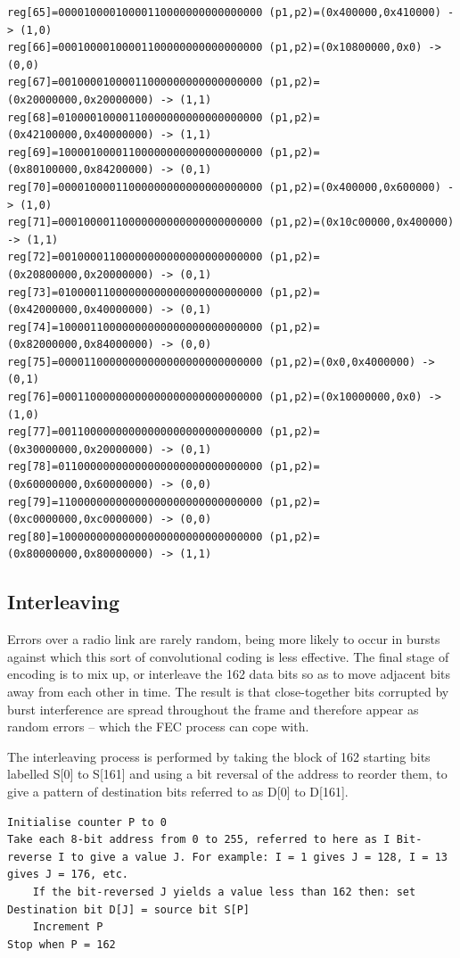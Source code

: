 \begin{lstlisting}
reg[65]=00001000010000110000000000000000 (p1,p2)=(0x400000,0x410000) -> (1,0)
reg[66]=00010000100001100000000000000000 (p1,p2)=(0x10800000,0x0) -> (0,0)
reg[67]=00100001000011000000000000000000 (p1,p2)=(0x20000000,0x20000000) -> (1,1)
reg[68]=01000010000110000000000000000000 (p1,p2)=(0x42100000,0x40000000) -> (1,1)
reg[69]=10000100001100000000000000000000 (p1,p2)=(0x80100000,0x84200000) -> (0,1)
reg[70]=00001000011000000000000000000000 (p1,p2)=(0x400000,0x600000) -> (1,0)
reg[71]=00010000110000000000000000000000 (p1,p2)=(0x10c00000,0x400000) -> (1,1)
reg[72]=00100001100000000000000000000000 (p1,p2)=(0x20800000,0x20000000) -> (0,1)
reg[73]=01000011000000000000000000000000 (p1,p2)=(0x42000000,0x40000000) -> (0,1)
reg[74]=10000110000000000000000000000000 (p1,p2)=(0x82000000,0x84000000) -> (0,0)
reg[75]=00001100000000000000000000000000 (p1,p2)=(0x0,0x4000000) -> (0,1)
reg[76]=00011000000000000000000000000000 (p1,p2)=(0x10000000,0x0) -> (1,0)
reg[77]=00110000000000000000000000000000 (p1,p2)=(0x30000000,0x20000000) -> (0,1)
reg[78]=01100000000000000000000000000000 (p1,p2)=(0x60000000,0x60000000) -> (0,0)
reg[79]=11000000000000000000000000000000 (p1,p2)=(0xc0000000,0xc0000000) -> (0,0)
reg[80]=10000000000000000000000000000000 (p1,p2)=(0x80000000,0x80000000) -> (1,1)
\end{lstlisting}

\hypertarget{interleaving}{%
\subsection{Interleaving}\label{interleaving}}

Errors over a radio link are rarely random, being more likely to occur
in bursts against which this sort of convolutional coding is less
effective. The final stage of encoding is to mix up, or interleave the
162 data bits so as to move adjacent bits away from each other in time.
The result is that close-together bits corrupted by burst interference
are spread throughout the frame and therefore appear as random errors --
which the FEC process can cope with.

The interleaving process is performed by taking the block of 162
starting bits labelled S{[}0{]} to S{[}161{]} and using a bit reversal
of the address to reorder them, to give a pattern of destination bits
referred to as D{[}0{]} to D{[}161{]}.

\begin{lstlisting}
Initialise counter P to 0
Take each 8-bit address from 0 to 255, referred to here as I Bit-reverse I to give a value J. For example: I = 1 gives J = 128, I = 13 gives J = 176, etc.
    If the bit-reversed J yields a value less than 162 then: set Destination bit D[J] = source bit S[P]
    Increment P
Stop when P = 162
\end{lstlisting}

